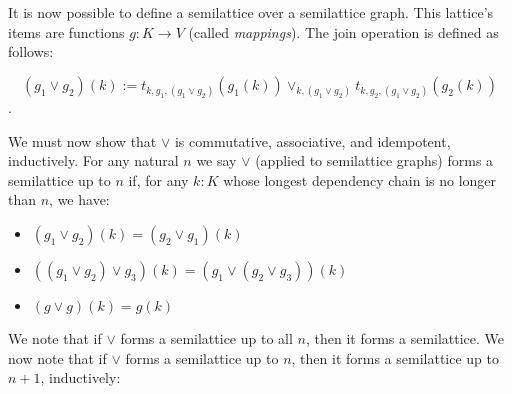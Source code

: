 \documentclass{article}
\begin{document}
        It is now possible to define a semilattice over a semilattice graph. This lattice's items are functions $g : K \rightarrow V$ (called \emph{mappings}). The join operation is defined as follows:

        $$ (g_1 \vee g_2)(k) := t_{k, g_1, (g_1 \vee g_2)}(g_1(k)) \vee_{k, (g_1 \vee g_2)} t_{k, g_2, (g_1 \vee g_2)}(g_2(k))$$.

        We must now show that $\vee$ is commutative, associative, and idempotent, inductively. For any natural $n$ we say $\vee$ (applied to semilattice graphs) forms a semilattice up to $n$ if, for any $k : K$ whose longest dependency chain is no longer than $n$, we have:

        \begin{itemize}
          \item $(g_1 \vee g_2)(k) = (g_2 \vee g_1)(k)$
          \item $((g_1 \vee g_2) \vee g_3)(k) = (g_1 \vee (g_2 \vee g_3))(k)$
          \item $(g \vee g)(k) = g(k)$
        \end{itemize}

        We note that if $\vee$ forms a semilattice up to all $n$, then it forms a semilattice. We now note that if $\vee$ forms a semilattice up to $n$, then it forms a semilattice up to $n+1$, inductively:
\end{document}
